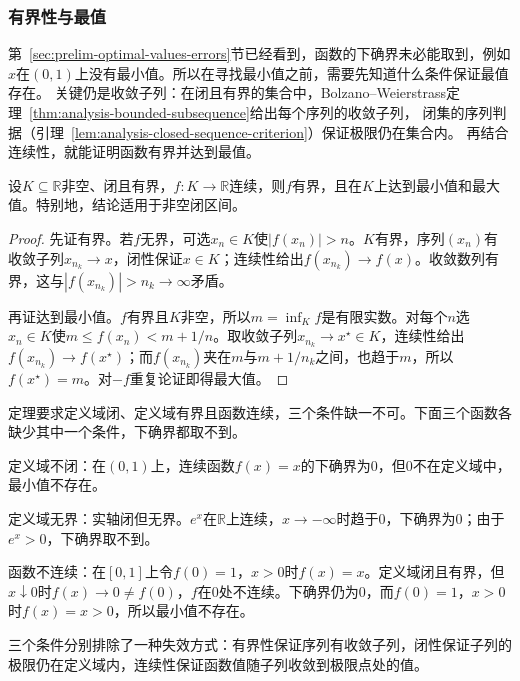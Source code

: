 \subsubsection{有界性与最值}
第~\ref{sec:prelim-optimal-values-errors}节已经看到，函数的下确界未必能取到，例如$x$在$(0,1)$上没有最小值。所以在寻找最小值之前，需要先知道什么条件保证最值存在。
关键仍是收敛子列：在闭且有界的集合中，Bolzano--Weierstrass定理~\ref{thm:analysis-bounded-subsequence}给出每个序列的收敛子列，
闭集的序列判据（引理~\ref{lem:analysis-closed-sequence-criterion}）保证极限仍在集合内。
再结合连续性，就能证明函数有界并达到最值。
\begin{theorem}[闭有界集上的极值定理]
\label{thm:analysis-extreme-value}
设$K\subseteq\mathbb R$非空、闭且有界，$f:K\to\mathbb R$连续，则$f$有界，且在$K$上达到最小值和最大值。特别地，结论适用于非空闭区间。
\end{theorem}
\begin{proof}
先证有界。若$f$无界，可选$x_n\in K$使$|f(x_n)|>n$。$K$有界，序列$(x_n)$有收敛子列$x_{n_k}\to x$，闭性保证$x\in K$；连续性给出$f(x_{n_k})\to f(x)$。收敛数列有界，这与$|f(x_{n_k})|>n_k\to\infty$矛盾。

再证达到最小值。$f$有界且$K$非空，所以$m=\inf_K f$是有限实数。对每个$n$选$x_n\in K$使$m\leq f(x_n)<m+1/n$。取收敛子列$x_{n_k}\to x^\star\in K$，连续性给出$f(x_{n_k})\to f(x^\star)$；而$f(x_{n_k})$夹在$m$与$m+1/n_k$之间，也趋于$m$，所以$f(x^\star)=m$。对$-f$重复论证即得最大值。
\end{proof}
定理要求定义域闭、定义域有界且函数连续，三个条件缺一不可。下面三个函数各缺少其中一个条件，下确界都取不到。
\begin{example}[极值定理的条件]
\label{ex:analysis-extrema-failures}
定义域不闭：在$(0,1)$上，连续函数$f(x)=x$的下确界为$0$，但$0$不在定义域中，最小值不存在。

定义域无界：实轴闭但无界。$e^x$在$\mathbb R$上连续，$x\to-\infty$时趋于$0$，下确界为$0$；由于$e^x>0$，下确界取不到。

函数不连续：在$[0,1]$上令$f(0)=1$，$x>0$时$f(x)=x$。定义域闭且有界，但$x\downarrow0$时$f(x)\to0\neq f(0)$，$f$在$0$处不连续。下确界仍为$0$，而$f(0)=1$，$x>0$时$f(x)=x>0$，所以最小值不存在。
\end{example}
三个条件分别排除了一种失效方式：有界性保证序列有收敛子列，闭性保证子列的极限仍在定义域内，连续性保证函数值随子列收敛到极限点处的值。

